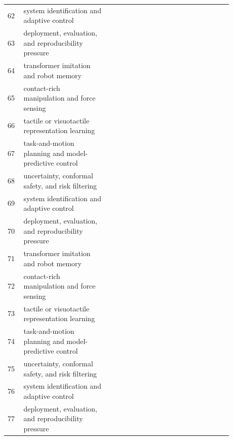 \documentclass{article}
\begin{document}
\begin{longtable}{p{0.06\linewidth}p{0.34\linewidth}p{0.48\linewidth}}
62 & system identification and adaptive control & \citep{jesusanmi2024investigating184,botezatu2025hybrid185,hung2021contextual186} \\
63 & deployment, evaluation, and reproducibility pressure & \citep{khan2024neusyre187,kaur2025visuallanguage188,kovari2025a189} \\
64 & transformer imitation and robot memory & \citep{hu2024integrated190,fei2024analysis191,fu2023ptflownet192} \\
65 & contact-rich manipulation and force sensing & \citep{kassab2024languageextended193,guo2012a194,kundu2023isggt195} \\
66 & tactile or visuotactile representation learning & \citep{zhao2023generating196,wyss2006a197,zhang2022knowledgebased198} \\
67 & task-and-motion planning and model-predictive control & \citep{doi2022detecting199,dilek2025an200,chen2023automated201} \\
68 & uncertainty, conformal safety, and risk filtering & \citep{zhang2023htcgrasp202,liu2025fusionperceptiontoaction203,yang2025spike204} \\
69 & system identification and adaptive control & \citep{chen2025expanding205,liang2021sscnav206,dong2022visual207} \\
70 & deployment, evaluation, and reproducibility pressure & \citep{hayder2024dsgg208,dong2024panocontextformer209,ma2021relatext210} \\
71 & transformer imitation and robot memory & \citep{fei2023scene211,yadav2025txtreme212,vasan2024detection213} \\
72 & contact-rich manipulation and force sensing & \citep{zhang2024endtoend214,li2024sgtr215,fukushima2022object216} \\
73 & tactile or visuotactile representation learning & \citep{marban2019a217,zhao2020peginhole218,kannan2024placeformer219} \\
74 & task-and-motion planning and model-predictive control & \citep{chen2024trakdis220,sun2024forceconstrained221,li2024nerfcodec222} \\
75 & uncertainty, conformal safety, and risk filtering & \citep{zhi2025lscenellm223,wu2023str224,sudhakaran2023vision225} \\
76 & system identification and adaptive control & \citep{zhang2023forceformer226,liu2022multiagent227,chen2024lsvit228} \\
77 & deployment, evaluation, and reproducibility pressure & \citep{heuer2018separate229,sortino2023transformerbased230} \\
\bottomrule
\end{longtable}
\end{document}
